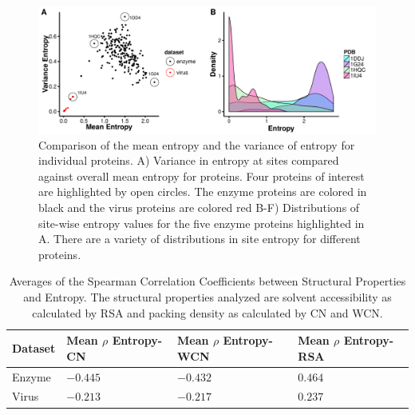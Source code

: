 \documentclass[12pt]{article}
\begin{document}
 
 
        \begin{figure}[H]
            \centerline{\includegraphics[width=6.5in]{protein_ex_plot.pdf}}     
            \caption{Comparison of the mean entropy and the variance of entropy for individual proteins. A)  Variance in entropy at sites compared against overall mean entropy for proteins. Four proteins of interest are highlighted by open circles. The enzyme proteins are colored in black and the virus proteins are colored red B-F) Distributions of site-wise entropy values for the five enzyme proteins highlighted in A. There are a variety of distributions in site entropy for different proteins.}
            \label{fig:protein_ex_plot}
    \end{figure}
     

\begin{center}
	\begin{table}[H]
	\begin{tabular}{| p{1.5cm} | p{2.5cm} | p{2cm} | p{2cm} | }
		\hline
		Dataset & Mean $\rho$ Entropy-CN  & Mean $\rho$ Entropy-WCN & Mean $\rho$ Entropy-RSA \\
		\hline	
		Enzyme &  $-0.445$  & $-0.432$ & $0.464$ \\[0.10cm]
	
		Virus & $-0.213$ & $-0.217$ & $0.237$ \\
		\hline	
	\end{tabular}
	\caption{Averages of the Spearman Correlation Coefficients between Structural Properties and Entropy. The structural properties analyzed are solvent accessibility as calculated by RSA and packing density as calculated by CN and WCN.}
	\label{table:entropy_stats}
	\end{table}
\end{center}
\end{document}
